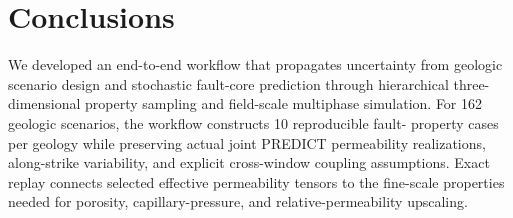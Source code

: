 
\section{Conclusions}

We developed an end-to-end workflow that propagates uncertainty from geologic
scenario design and stochastic fault-core prediction through hierarchical
three-dimensional property sampling and field-scale multiphase simulation.
For 162 geologic scenarios, the workflow constructs 10 reproducible fault-
property cases per geology while preserving actual joint PREDICT permeability
realizations, along-strike variability, and explicit cross-window coupling
assumptions. Exact replay connects selected effective permeability tensors to
the fine-scale properties needed for porosity, capillary-pressure, and
relative-permeability upscaling.

